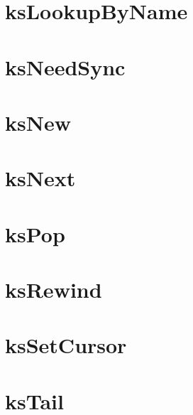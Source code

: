 \let\mypdfximage\pdfximage\def\pdfximage{\immediate\mypdfximage}\documentclass[twoside]{book}
\newcommand{\+}{\discretionary{\mbox{\scriptsize$\hookleftarrow$}}{}{}}
\begin{document}
\chapter{ks\+Lookup\+By\+Name}
\label{doc_contrib_api_reviews_core_ksLookupByName_md}

\chapter{ks\+Need\+Sync}
\label{doc_contrib_api_reviews_core_ksNeedSync_md}

\chapter{ks\+New}
\label{doc_contrib_api_reviews_core_ksNew_md}

\chapter{ks\+Next}
\label{doc_contrib_api_reviews_core_ksNext_md}

\chapter{ks\+Pop}
\label{doc_contrib_api_reviews_core_ksPop_md}

\chapter{ks\+Rewind}
\label{doc_contrib_api_reviews_core_ksRewind_md}

\chapter{ks\+Set\+Cursor}
\label{doc_contrib_api_reviews_core_ksSetCursor_md}

\chapter{ks\+Tail}
\label{doc_contrib_api_reviews_core_ksTail_md}

\end{document}
